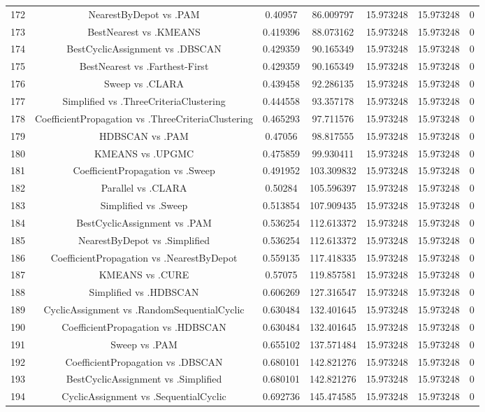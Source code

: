 \documentclass[a4paper,10pt]{article}
\begin{document}
\begin{landscape}
\begin{table}[!htp]
\begin{tabular}{ccccccc}
172&NearestByDepot vs .PAM&0.40957&86.009797&15.973248&15.973248&0\\
173&BestNearest vs .KMEANS&0.419396&88.073162&15.973248&15.973248&0\\
174&BestCyclicAssignment vs .DBSCAN&0.429359&90.165349&15.973248&15.973248&0\\
175&BestNearest vs .Farthest-First&0.429359&90.165349&15.973248&15.973248&0\\
176&Sweep vs .CLARA&0.439458&92.286135&15.973248&15.973248&0\\
177&Simplified vs .ThreeCriteriaClustering&0.444558&93.357178&15.973248&15.973248&0\\
178&CoefficientPropagation vs .ThreeCriteriaClustering&0.465293&97.711576&15.973248&15.973248&0\\
179&HDBSCAN vs .PAM&0.47056&98.817555&15.973248&15.973248&0\\
180&KMEANS vs .UPGMC&0.475859&99.930411&15.973248&15.973248&0\\
181&CoefficientPropagation vs .Sweep&0.491952&103.309832&15.973248&15.973248&0\\
182&Parallel vs .CLARA&0.50284&105.596397&15.973248&15.973248&0\\
183&Simplified vs .Sweep&0.513854&107.909435&15.973248&15.973248&0\\
184&BestCyclicAssignment vs .PAM&0.536254&112.613372&15.973248&15.973248&0\\
185&NearestByDepot vs .Simplified&0.536254&112.613372&15.973248&15.973248&0\\
186&CoefficientPropagation vs .NearestByDepot&0.559135&117.418335&15.973248&15.973248&0\\
187&KMEANS vs .CURE&0.57075&119.857581&15.973248&15.973248&0\\
188&Simplified vs .HDBSCAN&0.606269&127.316547&15.973248&15.973248&0\\
189&CyclicAssignment vs .RandomSequentialCyclic&0.630484&132.401645&15.973248&15.973248&0\\
190&CoefficientPropagation vs .HDBSCAN&0.630484&132.401645&15.973248&15.973248&0\\
191&Sweep vs .PAM&0.655102&137.571484&15.973248&15.973248&0\\
192&CoefficientPropagation vs .DBSCAN&0.680101&142.821276&15.973248&15.973248&0\\
193&BestCyclicAssignment vs .Simplified&0.680101&142.821276&15.973248&15.973248&0\\
194&CyclicAssignment vs .SequentialCyclic&0.692736&145.474585&15.973248&15.973248&0\\

\end{tabular}
\end{table}
\end{landscape}
\end{document}
